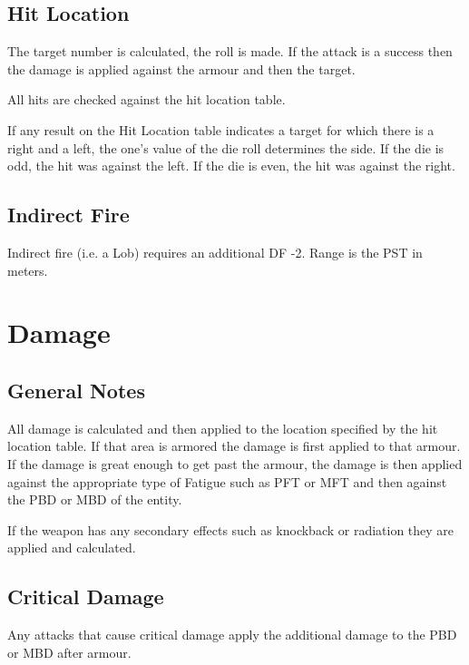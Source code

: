 

\subsection{Hit Location}

The target number is calculated, the roll is made. If the attack
is a success then the damage is applied against the armour and then
the target.

All hits are checked against the hit location table.



If any result on the Hit Location table indicates a target for which there
is a right and a left, the one's value of the die roll determines the side.
If the die is odd, the hit was against the left. If the die is even, the hit
was against the right.

\subsection{Indirect Fire}

Indirect fire (i.e. a Lob) requires an additional DF -2. Range is the
PST in meters.

\section{Damage}

\subsection{General Notes}

All damage is calculated and then applied to the location specified
by the hit location table. If that area is armored the damage is
first applied to that armour. If the damage is great enough to get
past the armour, the damage is then applied against the
appropriate type of Fatigue such as PFT or MFT and then against the
PBD or MBD of the entity.

If the weapon has any secondary effects such as knockback or radiation
they are applied and calculated.

\subsection{Critical Damage}

Any attacks that cause critical damage apply the additional damage to
the PBD or MBD after armour.


